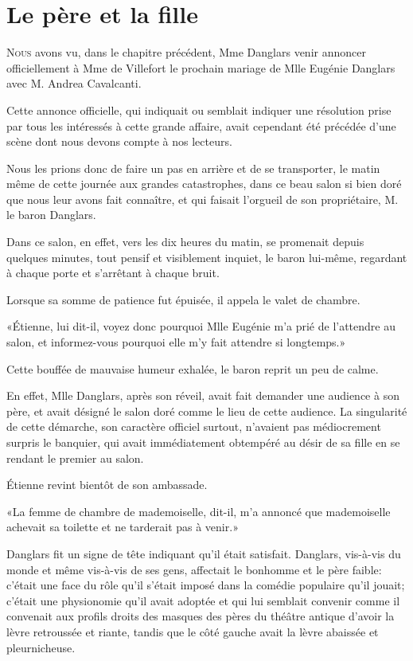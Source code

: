 \chapter{Le père et la fille}

\lettrine{N}{ous} avons vu, dans le chapitre précédent, Mme Danglars venir annoncer officiellement à Mme de Villefort le prochain mariage de Mlle Eugénie Danglars avec M. Andrea Cavalcanti. 

\zz
Cette annonce officielle, qui indiquait ou semblait indiquer une résolution prise par tous les intéressés à cette grande affaire, avait cependant été précédée d'une scène dont nous devons compte à nos lecteurs. 

Nous les prions donc de faire un pas en arrière et de se transporter, le matin même de cette journée aux grandes catastrophes, dans ce beau salon si bien doré que nous leur avons fait connaître, et qui faisait l'orgueil de son propriétaire, M. le baron Danglars. 

Dans ce salon, en effet, vers les dix heures du matin, se promenait depuis quelques minutes, tout pensif et visiblement inquiet, le baron lui-même, regardant à chaque porte et s'arrêtant à chaque bruit. 

Lorsque sa somme de patience fut épuisée, il appela le valet de chambre. 

«Étienne, lui dit-il, voyez donc pourquoi Mlle Eugénie m'a prié de l'attendre au salon, et informez-vous pourquoi elle m'y fait attendre si longtemps.» 

Cette bouffée de mauvaise humeur exhalée, le baron reprit un peu de calme. 

En effet, Mlle Danglars, après son réveil, avait fait demander une audience à son père, et avait désigné le salon doré comme le lieu de cette audience. La singularité de cette démarche, son caractère officiel surtout, n'avaient pas médiocrement surpris le banquier, qui avait immédiatement obtempéré au désir de sa fille en se rendant le premier au salon. 

Étienne revint bientôt de son ambassade. 

«La femme de chambre de mademoiselle, dit-il, m'a annoncé que mademoiselle achevait sa toilette et ne tarderait pas à venir.» 

Danglars fit un signe de tête indiquant qu'il était satisfait. Danglars, vis-à-vis du monde et même vis-à-vis de ses gens, affectait le bonhomme et le père faible: c'était une face du rôle qu'il s'était imposé dans la comédie populaire qu'il jouait; c'était une physionomie qu'il avait adoptée et qui lui semblait convenir comme il convenait aux profils droits des masques des pères du théâtre antique d'avoir la lèvre retroussée et riante, tandis que le côté gauche avait la lèvre abaissée et pleurnicheuse. 

